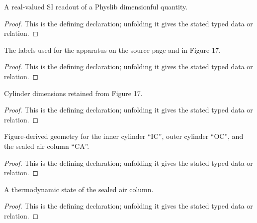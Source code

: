 \begin{definition}[siValue]
  \label{decl:physics:IPhO_2026_4_A_5:siValue}
  A real-valued SI readout of a Physlib dimensionful quantity.
\end{definition}
\begin{proof}
  This is the defining declaration; unfolding it gives the stated typed data or relation.
\end{proof}

\begin{definition}[ApparatusLabel]
  \label{decl:physics:IPhO_2026_4_A_5:ApparatusLabel}
  The labels used for the apparatus on the source page and in Figure 17.
\end{definition}
\begin{proof}
  This is the defining declaration; unfolding it gives the stated typed data or relation.
\end{proof}

\begin{definition}[CylinderDimensions]
  \label{decl:physics:IPhO_2026_4_A_5:CylinderDimensions}
  Cylinder dimensions retained from Figure 17.
\end{definition}
\begin{proof}
  This is the defining declaration; unfolding it gives the stated typed data or relation.
\end{proof}

\begin{definition}
  \label{decl:physics:IPhO_2026_4_A_5:Figure17Geometry}
  Figure-derived geometry for the inner cylinder “IC”, outer cylinder “OC”, and the sealed air column “CA”.
\end{definition}
\begin{proof}
  This is the defining declaration; unfolding it gives the stated typed data or relation.
\end{proof}

\begin{definition}[AirColumnState]
  \label{decl:physics:IPhO_2026_4_A_5:AirColumnState}
  A thermodynamic state of the sealed air column.
\end{definition}
\begin{proof}
  This is the defining declaration; unfolding it gives the stated typed data or relation.
\end{proof}

